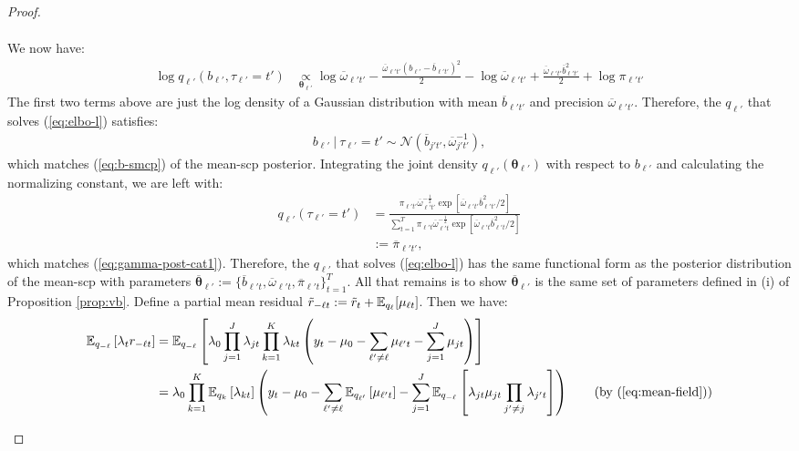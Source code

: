 \begin{proof}
\begin{enumerate}[label=\roman*.]
\begin{align*}
\end{align*}
We now have:
\begin{align*}
    \log q_{\ell'}(b_{\ell'},\tau_{\ell'}=t') 
    &\underset{\boldsymbol{\theta}_{\ell'}}{\propto} \log \overline{\omega}_{\ell't'} - \frac{\overline{\omega}_{\ell't'}(b_{\ell'} - \overline{b}_{\ell't'})^2}{2} - \log \overline{\omega}_{\ell't'} + \frac{\overline{\omega}_{\ell't'}\overline{b}^2_{\ell't'}}{2}+ \log \pi_{\ell' t'}
\end{align*}
The first two terms above are just the log density of a Gaussian distribution with mean $\overline{b}_{\ell't'} $ and precision $\overline{\omega}_{\ell't'}$. Therefore, the $q_{\ell'}$ that solves (\ref{eq:elbo-l}) satisfies:
\begin{align*}
    b_{\ell'} \:|\: \tau_{\ell'} = t' \sim \mathcal{N}(\overline{b}_{j't'}, \overline{\omega}^{-1}_{j't'}),
\end{align*}
which matches (\ref{eq:b-smcp}) of the mean-scp posterior. Integrating the joint density $q_{\ell'}(\boldsymbol{\theta}_{\ell'})$ with respect to $b_{\ell'}$ and calculating the normalizing constant, we are left with: 
\begin{align*}
    q_{\ell'}(\tau_{\ell'} = t') &= \frac{\pi_{\ell't'} \overline{\omega}_{\ell't'}^{-\frac{1}{2}} \exp[\overline{\omega}_{\ell't'} \overline{b}^2_{\ell't'}/2]}{\sum_{t=1}^T \pi_{\ell't} \overline{\omega}_{\ell't}^{-\frac{1}{2}} \exp[\overline{\omega}_{\ell't} \overline{b}^2_{\ell't}/2]}\\ 
    &:= \overline{\pi}_{\ell't'}, 
\end{align*}
which matches (\ref{eq:gamma-post-cat1}). Therefore, the $q_{\ell'}$ that solves (\ref{eq:elbo-l}) has the same functional form as the posterior distribution of the mean-scp with parameters $\overline{\boldsymbol{\theta}}_{\ell'} := \{\overline{b}_{\ell't},\overline{\omega}_{\ell't},\overline{\pi}_{\ell't}\}_{t=1}^T$. All that remains is to show $\overline{\boldsymbol{\theta}}_{\ell'}$ is the same set of parameters defined in (i) of Proposition \ref{prop:vb}. Define a partial mean residual $\tilde{r}_{-\ell t} :=  \tilde{r}_{t} + \mathbb{E}_{q_{\ell}}[\mu_{\ell t}]$. Then we have:
\begin{align*}
    \E_{q_{-\ell}}\left[\lambda_{t}r_{-\ell t}\right] &= \E_{q_{-\ell}}\left[\lambda_0\prod_{j=1}^J\lambda_{jt}\prod_{k=1}^K\lambda_{kt} \left(y_t - \mu_0 - \sum_{\ell'\neq \ell} \mu_{\ell't} - \sum_{j=1}^J \mu_{jt}\right)\right] \\
    &= \lambda_0 \prod_{k=1}^K\E_{q_{k}}\left[\lambda_{kt}\right]\left(y_t -\mu_0 - \sum_{\ell'\neq \ell} \E_{q_{\ell'}}\left[\mu_{\ell' t}\right] - \sum_{j=1}^J \E_{q_{-\ell}}\left[\lambda_{jt}\mu_{jt}\prod_{j'\neq j} \lambda_{j't}\right]\right) \tag{by (\ref{eq:mean-field})} \\

\end{align*}
\end{enumerate}
\end{proof}

